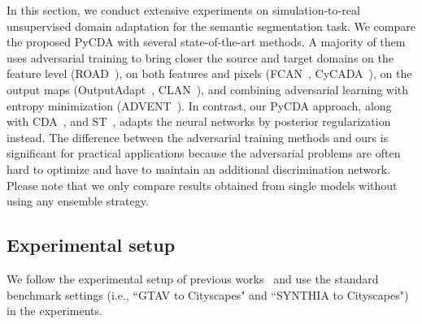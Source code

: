 \documentclass[10pt,twocolumn,letterpaper]{article}
\begin{document}
In this section, we conduct extensive experiments on simulation-to-real unsupervised domain adaptation for the semantic segmentation task. We compare the proposed PyCDA with several state-of-the-art methods. A majority of them uses adversarial training to bring closer the source and target domains on the feature level (ROAD~\cite{road_2018_CVPR}), on both features and pixels (FCAN~\cite{fcan_2018_CVPR}, CyCADA~\cite{Hoffman_cycada2017}), on the output maps (OutputAdapt~\cite{Adaptseg_Tsai_2018_CVPR}, CLAN~\cite{luo2018taking}), and combining adversarial learning with entropy minimization (ADVENT~\cite{vu2018advent}). In contrast, our PyCDA approach, along with  CDA~\cite{curriculum_tpami}, and ST~\cite{self_motivated_2018_ECCV}, adapts the neural networks by posterior regularization instead. The difference between the adversarial training methods and ours is significant for practical applications because the  adversarial problems are often hard to optimize and have to maintain an additional discrimination network. {Please note that we only compare results obtained from single models without using any ensemble strategy.}



\subsection{Experimental setup}
We follow the experimental setup of previous works~\cite{curriculum_tpami,road_2018_CVPR,fcan_2018_CVPR,self_motivated_2018_ECCV} and use the standard benchmark settings (i.e., ``GTAV to Cityscapes" and ``SYNTHIA to Cityscapes") in the experiments.
\end{document}
